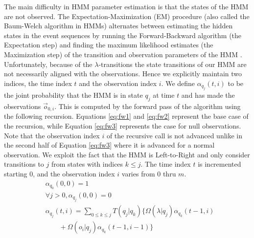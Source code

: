 \documentclass[letterpaper]{article}
\begin{document}
The main difficulty in HMM parameter estimation is that the
states of the HMM are not observed. The Expectation-Maximization  (EM)
procedure (also called the Baum-Welch algorithm in HMMs) alternates between estimating the hidden states in the event sequences by running the Forward-Backward algorithm (the Expectation step) and finding the maximum likelihood estimates (the Maximization step) of the transition and observation parameters of the HMM \cite{baum1970maximization}. %
Unfortunately, because of the $\lambda$-transitions the state transitions of our HMM are not necessarily aligned with the observations. Hence we
explicitly maintain two indices, the time index $t$ and the observation index $i$.  We define $\alpha_{q_j}(t,i)$ to be the joint probability that the HMM is in state $q_j$ at time $t$ and has made the observations $\vec{o}_{0,i}$. This is computed by the forward pass of the algorithm using the following recursion. Equations \ref{eq:fw1} and \ref{eq:fw2} represent the base case of the recursion, while Equation \ref{eq:fw3} represents the case for null observations. Note that the observation index $i$ of the recursive call is not advanced unlike in the second half of Equation \ref{eq:fw3} where it is advanced for a normal observation.  We exploit the fact that the HMM is Left-to-Right and only consider transitions to $j$ from states with indices $k \leq j$. The time index $t$ is incremented starting $0$, and the observation index $i$ varies from $0$ thru $m$. %
{\footnotesize
\begin{align}
&\alpha_{q_0}(0,0) = 1 \label{eq:fw1}\\
&\forall j > 0, \alpha_{q_j}(0,0) = 0 \label{eq:fw2}\\
&\alpha_{q_j}(t,i) = \sum_{0 \leq k \leq j} T(q_j|q_k) \{\Omega(\lambda|q_j) \alpha_{q_k}(t-1,i) \label{eq:fw3}\\
&\qquad + \Omega(o_{i}|q_j) \alpha_{q_k}(t-1,i-1) \} \nonumber
\end{align}
}%
\end{document}
